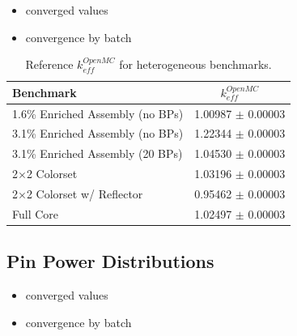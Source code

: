\begin{itemize}[noitemsep]
  \item converged values
  \item convergence by batch
\end{itemize}

\begin{table}[h!]
  \centering
  \caption[Reference $k^{OpenMC}_{eff}$ for heterogeneous benchmarks]{Reference $k^{OpenMC}_{eff}$ for heterogeneous benchmarks.}
  \small
  \label{table:chap7-ref-eigenvalues}
  \vspace{6pt}
  \begin{tabular}{l c}
  \toprule
  \textbf{Benchmark} & \textbf{$k^{OpenMC}_{eff}$} \\
  \midrule
  1.6\% Enriched Assembly (no \ac{BP}s) & 1.00987 $\pm$ 0.00003 \\
  3.1\% Enriched Assembly (no \ac{BP}s) & 1.22344 $\pm$ 0.00003 \\
  3.1\% Enriched Assembly (20 \ac{BP}s) & 1.04530 $\pm$ 0.00003 \\
  2$\times$2 Colorset & 1.03196 $\pm$ 0.00003 \\
  2$\times$2 Colorset w/ Reflector & 0.95462 $\pm$ 0.00003 \\
  Full Core & 1.02497 $\pm$ 0.00003 \\
  \bottomrule
\end{tabular}
\end{table}

\subsection{Pin Power Distributions}
\label{subsec:chap7-pin-powers}

\begin{itemize}[noitemsep]
  \item converged values
  \item convergence by batch
\end{itemize}

